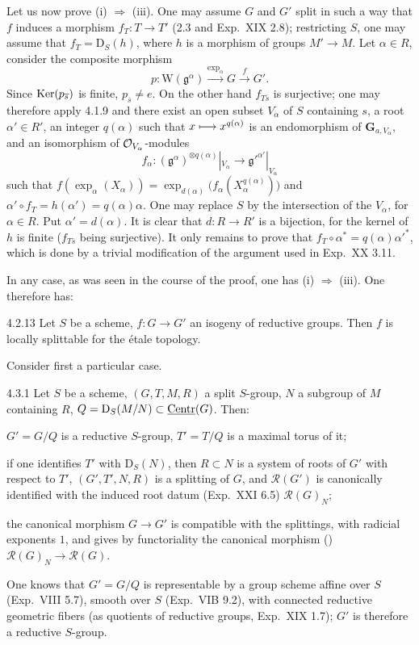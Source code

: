 Let us now prove (i) $\Rightarrow$ (iii). One may assume $G$ and $G'$ split in such a way that $f$ induces a morphism $f_T:T\to T'$ (2.3 and Exp.~XIX 2.8); restricting $S$, one may assume that $f_T=\mathrm D_S(h)$, where $h$ is a morphism of groups $M'\to M$. Let $\alpha\in R$, consider the composite morphism
\[
p:\mathrm W(\mathfrak g^\alpha)\xrightarrow{\exp_\alpha}G\xrightarrow f G'.
\]
Since $\operatorname{Ker}(p_{\overline s})$ is finite, $p_{\overline s}\ne e$. On the other hand $f_{T\overline s}$ is surjective; one may therefore apply 4.1.9 and there exist an open subset $V_\alpha$ of $S$ containing $s$, a root $\alpha'\in R'$, an integer $q(\alpha)$ such that $x\longmapsto x^{q(\alpha)}$ is an endomorphism of $\mathbf G_{a,V_\alpha}$, and an isomorphism of $\mathcal{O}_{V_\alpha}$-modules
\[
f_\alpha:(\mathfrak g^\alpha)^{\otimes q(\alpha)}|_{V_\alpha}\to\mathfrak g'^{\alpha'}|_{V_\alpha}
\]
such that $f(\exp_\alpha(X_\alpha))=\exp_{d(\alpha)}\bigl(f_\alpha(X_\alpha^{q(\alpha)})\bigr)$ and $\alpha'\circ f_T=h(\alpha')=q(\alpha)\alpha$. One may replace $S$ by the intersection of the $V_\alpha$, for $\alpha\in R$. Put $\alpha'=d(\alpha)$. It is clear that $d:R\to R'$ is a bijection, for the kernel of $h$ is finite ($f_{T\overline s}$ being surjective). It only remains to prove that $f_T\circ\alpha^*=q(\alpha)\alpha'^*$, which is done by a trivial modification of the argument used in Exp.~XX 3.11.

In any case, as was seen in the course of the proof, one has (i) $\Rightarrow$ (iii). One therefore has:
\begin{corollary}{4.2.13}\label{XXII.4.2.13}
Let $S$ be a scheme, $f:G\to G'$ an isogeny of reductive groups. Then $f$ is locally splittable for the \'etale topology.
\end{corollary}

Consider first a particular case.
\begin{proposition}{4.3.1}\label{XXII.4.3.1}
Let $S$ be a scheme, $(G,T,M,R)$ a split $S$-group, $N$ a subgroup of $M$ containing $R$, $Q=\mathrm D_S(M/N)\subset\underline{\mathrm{Centr}}(G)$. Then:
\begin{enumeratei}
\item $G'=G/Q$ is a reductive $S$-group, $T'=T/Q$ is a maximal torus of it;
\item if one identifies $T'$ with $\mathrm D_S(N)$, then $R\subset N$ is a system of roots of $G'$ with respect to $T'$, $(G',T',N,R)$ is a splitting of $G$, and $\mathscr R(G')$ is canonically identified with the induced root datum (Exp.~XXI 6.5) $\mathscr R(G)_N$;
\item the canonical morphism $G\to G'$ is compatible with the splittings, with radicial exponents $1$, and gives by functoriality the canonical morphism (\loccit) $\mathscr R(G)_N\to\mathscr R(G)$.
\end{enumeratei}
\end{proposition}
One knows that $G'=G/Q$ is representable by a group scheme affine over $S$ (Exp.~VIII 5.7), smooth over $S$ (Exp.~VIB 9.2), with connected reductive geometric fibers (as quotients of reductive groups, \cf Exp.~XIX 1.7); $G'$ is therefore a reductive $S$-group.

